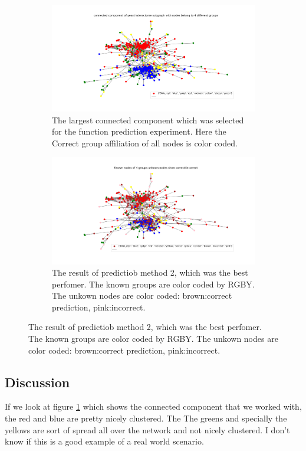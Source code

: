 \documentclass[a4paper,10pt]{article}
\theoremstyle{definition}
\theoremstyle{remark}
\theoremstyle{plain}
\begin{document}
\begin{figure}
\begin{framed}
\centering
\begin{subfigure}[b]{\textwidth}
\includegraphics[width=\textwidth]{connected component of yeast interactome subgraph with nodes belong to 4 different groups.png}
\caption{The largest connected component which was selected for the function
prediction experiment. Here the Correct group affiliation of all nodes is color
coded.}
\label{fig:largest_connected_comp}
\end{subfigure}
\begin{subfigure}[b]{\textwidth}
\includegraphics[width=\textwidth]{method2_true_false_clustering_on_4_groups_with_ordering_and_update.png}
\caption{The result of predictiob method 2, which was the best perfomer. 
The known groups are color coded by RGBY. The unkown nodes are color
coded: brown:correct prediction, pink:incorrect.}
\label{fig:my_prediction}
\end{subfigure}
\end{framed}
\end{figure}

\subsection{Discussion}
If we look at figure \ref{fig:largest_connected_comp} which shows the connected
component that we worked with, the red and blue are pretty nicely clustered. The
The greens and specially the yellows are sort of spread all over the network and
not nicely clustered. I don't know if this is a good example of a real world
scenario.
\end{document}
